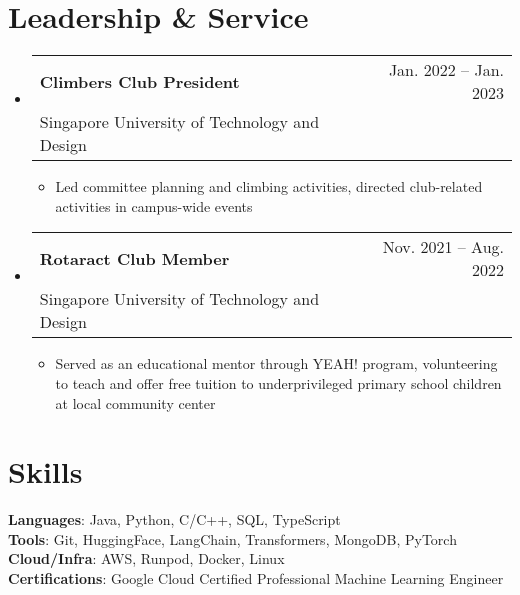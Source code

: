 \documentclass[letterpaper,11pt]{article}
\makeatletter
\newcommand{\resumeItem}[1]{
  \item\small{
    {#1 \vspace{-2pt}}
  }
}
\newcommand{\resumeSubheading}[4]{
  \vspace{-2pt}\item
    \begin{tabular*}{0.97\textwidth}[t]{l@{\extracolsep{\fill}}r}
      \textbf{#1} & #2 \\
      \textnormal{\small#3} & \textnormal{\small #4} \\
    \end{tabular*}\vspace{-7pt}
}
\newcommand{\resumeSubHeadingListStart}{\begin{itemize}[leftmargin=0.15in, label={}]}
\newcommand{\resumeSubHeadingListEnd}{\end{itemize}}
\newcommand{\resumeItemListStart}{\begin{itemize}}
\newcommand{\resumeItemListEnd}{\end{itemize}\vspace{-5pt}}
\makeatother
\begin{document}
\section{Leadership \& Service}
  \resumeSubHeadingListStart
    \resumeSubheading
      {Climbers Club President }{Jan. 2022  -- Jan. 2023}
      {Singapore University of Technology and Design}{}
      \resumeItemListStart
        \resumeItem{Led committee planning and climbing activities, directed club-related activities in campus-wide events}
      \resumeItemListEnd
    \resumeSubheading
      {Rotaract Club Member}{Nov. 2021  -- Aug. 2022}
      {Singapore University of Technology and Design}{}
      \resumeItemListStart
        \resumeItem{Served as an educational mentor through YEAH! program, volunteering to teach and offer free tuition to underprivileged primary school children at local community center}
      \resumeItemListEnd
  \resumeSubHeadingListEnd
%

\section{Skills}
 \begin{itemize}[leftmargin=0.15in, label={}]
    \small{\item{
     \textbf{Languages}{: Java, Python, C/C++, SQL, TypeScript} \\
     \textbf{Tools}{: Git, HuggingFace, LangChain, Transformers, MongoDB, PyTorch} \\
     \textbf{Cloud/Infra}{: AWS, Runpod, Docker, Linux} \\
     \textbf{Certifications}{: Google Cloud Certified Professional Machine Learning Engineer}
    }}
 \end{itemize}

\end{document}
